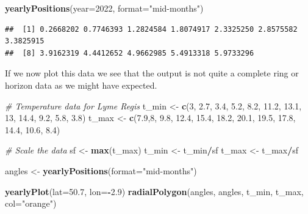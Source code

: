 \documentclass[
]{book}
\newenvironment{Shaded}{\begin{snugshade}}{\end{snugshade}}
\newcommand{\AttributeTok}[1]{\textcolor[rgb]{0.13,0.29,0.53}{#1}}
\newcommand{\CommentTok}[1]{\textcolor[rgb]{0.56,0.35,0.01}{\textit{#1}}}
\newcommand{\DecValTok}[1]{\textcolor[rgb]{0.00,0.00,0.81}{#1}}
\newcommand{\FloatTok}[1]{\textcolor[rgb]{0.00,0.00,0.81}{#1}}
\newcommand{\FunctionTok}[1]{\textcolor[rgb]{0.13,0.29,0.53}{\textbf{#1}}}
\newcommand{\NormalTok}[1]{#1}
\newcommand{\OtherTok}[1]{\textcolor[rgb]{0.56,0.35,0.01}{#1}}
\newcommand{\SpecialCharTok}[1]{\textcolor[rgb]{0.81,0.36,0.00}{\textbf{#1}}}
\newcommand{\StringTok}[1]{\textcolor[rgb]{0.31,0.60,0.02}{#1}}
\begin{document}
\begin{Shaded}
\begin{Highlighting}[]
\FunctionTok{yearlyPositions}\NormalTok{(}\AttributeTok{year=}\DecValTok{2022}\NormalTok{, }\AttributeTok{format=}\StringTok{"mid{-}months"}\NormalTok{)}
\end{Highlighting}
\end{Shaded}

\begin{verbatim}
##  [1] 0.2668202 0.7746393 1.2824584 1.8074917 2.3325250 2.8575582 3.3825915
##  [8] 3.9162319 4.4412652 4.9662985 5.4913318 5.9733296
\end{verbatim}

If we now plot this data we see that the output is not quite a complete ring or horizon data as we might have expected.

\begin{Shaded}
\begin{Highlighting}[]
\CommentTok{\# Temperature data for Lyme Regis}
\NormalTok{t\_min }\OtherTok{\textless{}{-}} \FunctionTok{c}\NormalTok{(}\DecValTok{3}\NormalTok{, }\FloatTok{2.7}\NormalTok{, }\FloatTok{3.4}\NormalTok{, }\FloatTok{5.2}\NormalTok{, }\FloatTok{8.2}\NormalTok{, }\FloatTok{11.2}\NormalTok{, }\FloatTok{13.1}\NormalTok{, }\DecValTok{13}\NormalTok{, }\FloatTok{14.4}\NormalTok{, }\FloatTok{9.2}\NormalTok{, }\FloatTok{5.8}\NormalTok{, }\FloatTok{3.8}\NormalTok{)}
\NormalTok{t\_max }\OtherTok{\textless{}{-}} \FunctionTok{c}\NormalTok{(}\FloatTok{7.9}\NormalTok{,}\DecValTok{8}\NormalTok{, }\FloatTok{9.8}\NormalTok{, }\FloatTok{12.4}\NormalTok{, }\FloatTok{15.4}\NormalTok{, }\FloatTok{18.2}\NormalTok{, }\FloatTok{20.1}\NormalTok{, }\FloatTok{19.5}\NormalTok{, }\FloatTok{17.8}\NormalTok{, }\FloatTok{14.4}\NormalTok{, }\FloatTok{10.6}\NormalTok{, }\FloatTok{8.4}\NormalTok{)}

\CommentTok{\# Scale the data}
\NormalTok{sf }\OtherTok{\textless{}{-}} \FunctionTok{max}\NormalTok{(t\_max)}
\NormalTok{t\_min }\OtherTok{\textless{}{-}}\NormalTok{ t\_min}\SpecialCharTok{/}\NormalTok{sf}
\NormalTok{t\_max }\OtherTok{\textless{}{-}}\NormalTok{ t\_max}\SpecialCharTok{/}\NormalTok{sf}

\NormalTok{angles }\OtherTok{\textless{}{-}} \FunctionTok{yearlyPositions}\NormalTok{(}\AttributeTok{format=}\StringTok{"mid{-}months"}\NormalTok{)}

\FunctionTok{yearlyPlot}\NormalTok{(}\AttributeTok{lat=}\FloatTok{50.7}\NormalTok{, }\AttributeTok{lon=}\SpecialCharTok{{-}}\FloatTok{2.9}\NormalTok{)}
\FunctionTok{radialPolygon}\NormalTok{(angles, angles, t\_min, t\_max, }\AttributeTok{col=}\StringTok{"orange"}\NormalTok{)}
\end{Highlighting}
\end{Shaded}
\end{document}
